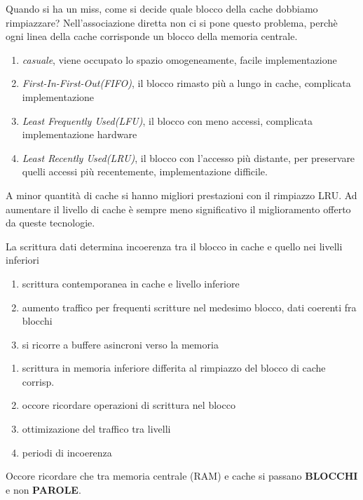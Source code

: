 \documentclass[12pt, a4paper]{article}
\begin{document}
\begin{defn}
Quando si ha un miss, come si decide quale blocco della cache dobbiamo rimpiazzare?
Nell'associazione diretta non ci si pone questo problema, perchè ogni linea della cache corrisponde un blocco della memoria centrale.

\begin{enumerate}
	\item \textit{casuale}, viene occupato lo spazio omogeneamente, facile implementazione
	\item \textit{First-In-First-Out(FIFO)}, il blocco rimasto più a lungo in cache, complicata implementazione
	\item \textit{Least Frequently Used(LFU)}, il blocco con meno accessi, complicata implementazione hardware
	\item \textit{Least Recently Used(LRU)}, il blocco con l'accesso più distante, per preservare quelli accessi più recentemente, implementazione difficile.
\end{enumerate}
A minor quantità di cache si hanno migliori prestazioni con il rimpiazzo LRU. Ad aumentare il livello di cache è sempre meno significativo il miglioramento offerto da queste tecnologie.
\end{defn}

La scrittura dati determina incoerenza tra il blocco in cache e quello nei livelli inferiori
\begin{defn}
\begin{enumerate}
	\item scrittura contemporanea in cache e livello inferiore
	\item aumento traffico per frequenti scritture nel medesimo blocco, dati coerenti fra blocchi
	\item si ricorre a buffere asincroni verso la memoria
\end{enumerate}
\end{defn}

\begin{defn}
\begin{enumerate}
	\item scrittura in memoria inferiore differita al rimpiazzo del blocco di cache corrisp.
	\item occore ricordare operazioni di scrittura nel blocco
	\item ottimizazione del traffico tra livelli
	\item periodi di incoerenza
\end{enumerate}
\end{defn}
Occore ricordare che tra memoria centrale (RAM) e cache si passano \textbf{BLOCCHI} e non \textbf{PAROLE}.
\end{document}
